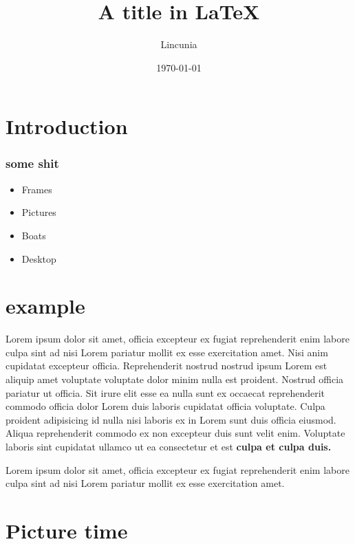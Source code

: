 \documentclass{beamer}
\title{A title in {\LaTeX}}
\institute[Colombia]{Central University}
\date{\today}
\author{Lincunia}
\begin{document}
\begin{frame}
  \titlepage
\end{frame}

\section{Introduction}

\begin{frame}
  \frametitle{some shit}
  \begin{itemize}
    \item Frames
    \item Pictures \pause
    \item Boats
    \item Desktop
  \end{itemize}
\end{frame}

\section{example}

\begin{frame}
  Lorem ipsum dolor sit amet, officia excepteur ex fugiat reprehenderit enim
  labore culpa sint ad nisi Lorem pariatur mollit ex esse exercitation amet.
  Nisi anim cupidatat excepteur officia. Reprehenderit nostrud nostrud ipsum
  Lorem est aliquip amet voluptate voluptate dolor minim nulla est proident.
  Nostrud officia pariatur ut officia. Sit irure elit esse ea nulla sunt ex
  occaecat reprehenderit commodo officia dolor Lorem duis laboris cupidatat
  officia voluptate. Culpa proident adipisicing id nulla nisi laboris ex in
  Lorem sunt duis officia eiusmod. Aliqua reprehenderit commodo ex non
  excepteur duis sunt velit enim. Voluptate laboris sint cupidatat ullamco ut
  ea consectetur et est
  \textbf{culpa et culpa duis.}
\end{frame}

\begin{frame}
  Lorem ipsum dolor sit amet, officia excepteur ex fugiat reprehenderit enim
  labore culpa sint ad nisi Lorem pariatur mollit ex esse exercitation amet.
\end{frame}

\section{Picture time}
\end{document}
